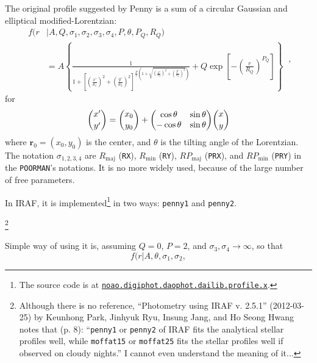 The original profile suggested by Penny is a sum of a circular Gaussian and elliptical modified-Lorentzian:
\begin{equation}\label{eq: profile penny}
  \begin{aligned}
    f(r &| A, Q, \sigma_1, \sigma_2, \sigma_3, \sigma_4, P, \theta, P_Q, R_Q)  \\
    &= A 
      \left \{ 
        \frac{1}
        {1 + \left[ 
          \left( \frac{x'}{\sigma_1} \right)^2 
          + \left( \frac{y'}{\sigma_2} \right)^2 
          \right ]
          ^{\frac{P}{2} 
            \left( 1 + \sqrt{\left( \frac{x'}{\sigma_3} \right)^2 
              + \left( \frac{y'}{\sigma_4} \right)^2 } \right) 
           }}
        + Q \exp \left [ - \left ( \frac{r}{R_Q} \right )^{P_Q} \right ]
      \right \}
  \end{aligned} ~,
\end{equation}
for
\begin{equation*}
  \binom{x'}{y'} = \binom{x_0}{y_0} 
  + \mqty(\cos \theta & \sin \theta \\ -\cos \theta & \sin \theta) \binom{x}{y}
\end{equation*}
where $ \textbf{r}_0 = (x_0, y_0) $ is the center, and $ \theta $ is the tilting angle of the Lorentzian. The notation $ \sigma_{1,2,3,4} $ are $ R_\mathrm{maj} $ (\texttt{RX}), $ R_\mathrm{min} $ (\texttt{RY}), $ RP_\mathrm{maj} $ (\texttt{PRX}), and $ RP_\mathrm{min} $ (\texttt{PRY}) in the \texttt{POORMAN}'s notations. It is no more widely used, because of the large number of free parameters.

In IRAF, it is implemented\footnote{The source code is at \href {https://github.com/iraf-community/iraf/blob/master/noao/digiphot/daophot/daolib/profile.x} {\texttt{noao.digiphot.daophot.dailib.profile.x}}.} in two ways: \texttt{penny1} and \texttt{penny2}. 



\footnote{Although there is no reference, ``Photometry using IRAF v. 2.5.1'' (2012-03-25) by Keunhong Park, Jinhyuk Ryu, Insung Jang, and Ho Seong Hwang notes that (p. 8): ``\texttt{penny1} or \texttt{penny2} of IRAF fits the analytical stellar profiles well, while \texttt{moffat15} or \texttt{moffat25} fits the stellar profiles well if observed on cloudy nights.'' I cannot even understand the meaning of it...}

Simple way of using it is, assuming $ Q = 0 $, $ P = 2 $, and $ \sigma_3, \sigma_4 \rightarrow \infty $, so that
\begin{equation}\label{eq: profile penny12}
  f(r|A, \theta, \sigma_1, \sigma_2, 
\end{equation}




